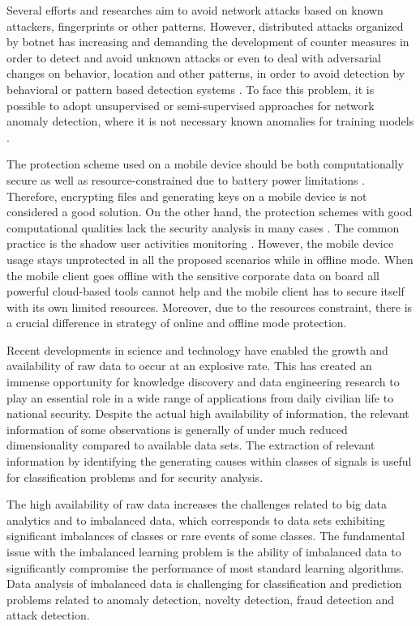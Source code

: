 Several efforts and researches aim to avoid network attacks based on known attackers, fingerprints or other patterns. However, distributed attacks organized by botnet has increasing and demanding the development of counter measures in order to detect and avoid unknown attacks or even to deal with adversarial changes on behavior, location and other patterns, in order to avoid detection by behavioral or pattern based detection systems \cite{gu2008botminer, garcia2014empirical,khattak2015botflex,acarali2016survey,wang2017botnet,Wang2018ddosbotnetssurvey}. To face this problem, it is possible to adopt unsupervised or semi-supervised approaches for network anomaly detection, where it is not necessary known anomalies for training models \cite{moustafa2019holistic}.

The protection scheme used on a mobile device should be both computationally secure as well as resource-constrained due to battery power limitations \cite{khan2015cloud}. Therefore, encrypting files and generating keys on a mobile device is not considered a good solution. On the other hand, the protection schemes with good computational qualities lack the security analysis in many cases \cite{khan2014bss}. The common practice is the shadow user activities monitoring \cite{yovel2014}. However, the mobile device usage stays unprotected in all the proposed scenarios while in offline mode. When the mobile client goes offline with the sensitive corporate data on board all powerful cloud-based tools cannot help and the mobile client has to secure itself with its own limited resources. Moreover, due to the resources constraint, there is a crucial difference in strategy of online and offline mode protection.

Recent developments in science and technology have enabled the growth and availability of raw data to occur at an explosive rate. This has created an immense opportunity for knowledge discovery and data engineering research to play an essential role in a wide range of applications from daily civilian life to national security. Despite the actual high availability of information, the relevant information of some observations is generally of under much reduced dimensionality compared to available data sets. The extraction of relevant information by identifying the generating causes within classes of signals is useful for classification problems and for security analysis. 

The high availability of raw data increases the challenges related to big data analytics and to imbalanced data, which corresponds to data sets exhibiting significant imbalances of classes or rare events of some classes. The fundamental issue with the imbalanced learning problem is the ability of imbalanced data to significantly compromise the performance of most standard learning algorithms. Data analysis of imbalanced data is challenging for classification and prediction problems related to anomaly detection, novelty detection, fraud detection and attack detection. 


